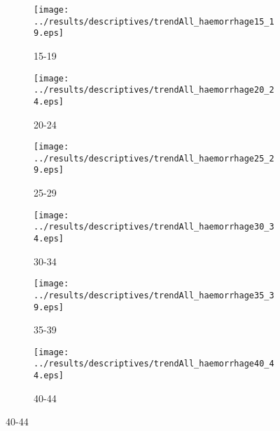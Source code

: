 \documentclass[12pt]{article}
\begin{document}
\begin{figure}[htpb!]
  \caption{Descriptive Figures by Quinquennial Age Groups (Haemorrhage)}
  \label{fig:haem5y}
  \begin{center}
    \begin{subfigure}{0.49\textwidth}
      \texttt{[image: ../results/descriptives/trendAll\_haemorrhage15\_19.eps]}
      \caption{15-19}
    \end{subfigure}
    \begin{subfigure}{0.49\textwidth}
      \texttt{[image: ../results/descriptives/trendAll\_haemorrhage20\_24.eps]}
      \caption{20-24}
    \end{subfigure}

    \begin{subfigure}{0.49\textwidth}
      \texttt{[image: ../results/descriptives/trendAll\_haemorrhage25\_29.eps]}
      \caption{25-29}
    \end{subfigure}
    \begin{subfigure}{0.49\textwidth}
      \texttt{[image: ../results/descriptives/trendAll\_haemorrhage30\_34.eps]}
      \caption{30-34}
    \end{subfigure}

        \begin{subfigure}{0.49\textwidth}
      \texttt{[image: ../results/descriptives/trendAll\_haemorrhage35\_39.eps]}
      \caption{35-39}
    \end{subfigure}
    \begin{subfigure}{0.49\textwidth}
      \texttt{[image: ../results/descriptives/trendAll\_haemorrhage40\_44.eps]}
      \caption{40-44}
    \end{subfigure}
  \end{center}
  \end{figure}
\end{document}
